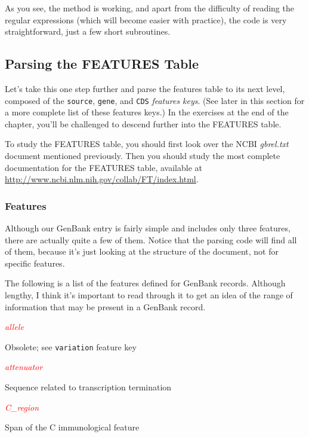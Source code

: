 As you see, the method is working, and apart from the difficulty of reading the regular expressions (which will become easier with practice), the code is very straightforward, just a few short subroutines. 

\subsection{Parsing the FEATURES Table}
Let's take this one step further and parse the features table to its next level, composed of the \verb|source|, \verb|gene|, and \verb|CDS| \textit{features keys}. (See later in this section for a more complete list of these features keys.) In the exercises at the end of the chapter, you'll be challenged to descend further into the FEATURES table.

To study the FEATURES table, you should first look over the NCBI \textit{gbrel.txt} document mentioned previously. Then you should study the most complete documentation for the FEATURES table, available at \href{http://www.ncbi.nlm.nih.gov/collab/FT/index.html}{http://www.ncbi.nlm.nih.gov/collab/FT/index.html}.

\subsubsection{Features}
Although our GenBank entry is fairly simple and includes only three features, there are actually quite a few of them. Notice that the parsing code will find all of them, because it's just looking at the structure of the document, not for specific features.  

The following is a list of the features defined for GenBank records.  Although lengthy, I think it's important to read through it to get an idea of the range of information that may be present in a GenBank record. 

\textcolor{red}{\textit{allele}}
\begin{adjustwidth}{1cm}{}
Obsolete; see \verb|variation| feature key
\end{adjustwidth}

\textcolor{red}{\textit{attenuator}}
\begin{adjustwidth}{1cm}{}
Sequence related to transcription termination
\end{adjustwidth}

\textcolor{red}{\textit{C\_region}}
\begin{adjustwidth}{1cm}{}
Span of the C immunological feature
\end{adjustwidth}

